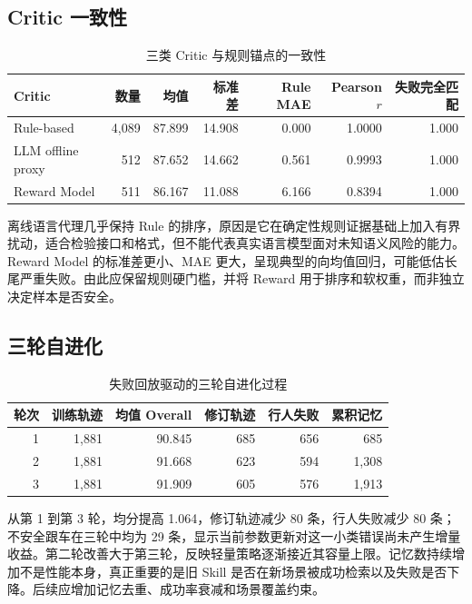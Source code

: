 \documentclass[UTF8,a4paper,12pt,fontset=fandol]{ctexart}
\begin{document}
\subsection{Critic 一致性}
\begin{table}[!htbp]
\centering\small
\caption{三类 Critic 与规则锚点的一致性}
\begin{tabular}{lrrrrrr}
\toprule
Critic & 数量 & 均值 & 标准差 & Rule MAE & Pearson $r$ & 失败完全匹配 \\
\midrule
Rule-based & 4,089 & 87.899 & 14.908 & 0.000 & 1.0000 & 1.000 \\
LLM offline proxy & 512 & 87.652 & 14.662 & 0.561 & 0.9993 & 1.000 \\
Reward Model & 511 & 86.167 & 11.088 & 6.166 & 0.8394 & 1.000 \\
\bottomrule
\end{tabular}
\end{table}

离线语言代理几乎保持 Rule 的排序，原因是它在确定性规则证据基础上加入有界扰动，适合检验接口和格式，但不能代表真实语言模型面对未知语义风险的能力。Reward Model 的标准差更小、MAE 更大，呈现典型的向均值回归，可能低估长尾严重失败。由此应保留规则硬门槛，并将 Reward 用于排序和软权重，而非独立决定样本是否安全。

\subsection{三轮自进化}
\begin{table}[!htbp]
\centering\small
\caption{失败回放驱动的三轮自进化过程}
\begin{tabular}{rrrrrr}
\toprule
轮次 & 训练轨迹 & 均值 Overall & 修订轨迹 & 行人失败 & 累积记忆 \\
\midrule
1 & 1,881 & 90.845 & 685 & 656 & 685 \\
2 & 1,881 & 91.668 & 623 & 594 & 1,308 \\
3 & 1,881 & 91.909 & 605 & 576 & 1,913 \\
\bottomrule
\end{tabular}
\end{table}

从第 1 到第 3 轮，均分提高 1.064，修订轨迹减少 80 条，行人失败减少 80 条；不安全跟车在三轮中均为 29 条，显示当前参数更新对这一小类错误尚未产生增量收益。第二轮改善大于第三轮，反映轻量策略逐渐接近其容量上限。记忆数持续增加不是性能本身，真正重要的是旧 Skill 是否在新场景被成功检索以及失败是否下降。后续应增加记忆去重、成功率衰减和场景覆盖约束。
\end{document}
